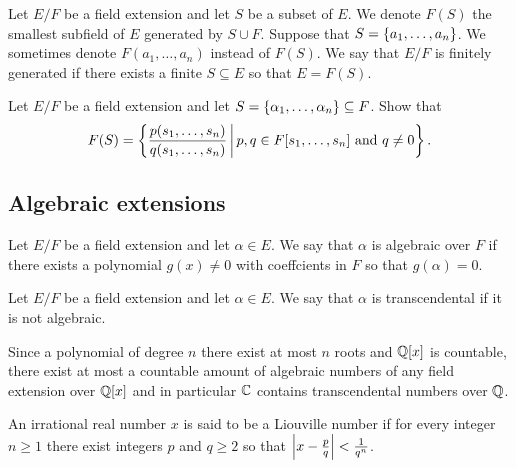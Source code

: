 \documentclass[11pt,a4paper]{article}
\begin{document}
\begin{definition}
  Let $E/F$ be a field extension and let $S$ be a subset of $E$.
  We denote $F(S)$ the smallest subfield of $E$ generated by $S \cup F$.
  Suppose that $S = \left\{a_1,\dots,a_n\right\}$.
  We sometimes denote $F(a_1,\dots,a_n)$ instead of $F(S)$.
  We say that $E/F$ is finitely generated if there exists a finite
  $S \subseteq E$ so that $E = F(S)$.
\end{definition}

\begin{exercise}
  Let $E/F$ be a field extension and let
  $S = \left\{\alpha_1,\dots,\alpha_n\right\} \subseteq F$.
  Show that
  \[
    F(S) = \left\{\frac{p(s_1,\dots,s_n)}{q(s_1,\dots,s_n)} \,\middle\vert\,
    p,q \in F[s_1,\dots,s_n] \text{ and } q \neq 0\right\}.
  \] 
\end{exercise}

\subsection{Algebraic extensions}
\begin{definition}
  Let $E/F$ be a field extension and let $\alpha \in E$.
  We say that $\alpha$ is algebraic over $F$ if there exists a polynomial
  $g(x) \neq 0$ with coeffcients in $F$ so that $g(\alpha) = 0$.
\end{definition}
\begin{definition}
  Let $E/F$ be a field extension and let $\alpha \in E$.
  We say that $\alpha$ is transcendental if it is not algebraic.
\end{definition}

\begin{remark}
  Since a polynomial of degree $n$ there exist at most $n$ roots
  and $\mathbb{Q}[x]$ is countable, there exist at most a countable amount
  of algebraic numbers of any field extension over $\mathbb{Q}[x]$
  and in particular $\mathbb{C}$ contains transcendental numbers over $\mathbb{Q}$.
\end{remark}

\begin{definition}
  An irrational real number $x$ is said to be a Liouville number if
  for every integer $n \geq 1$ there exist integers $p$ and $q \geq 2$ 
  so that $\left\lvert x - \frac{p}{q}\right\rvert < \frac{1}{q^n}$.
\end{definition}
\end{document}
